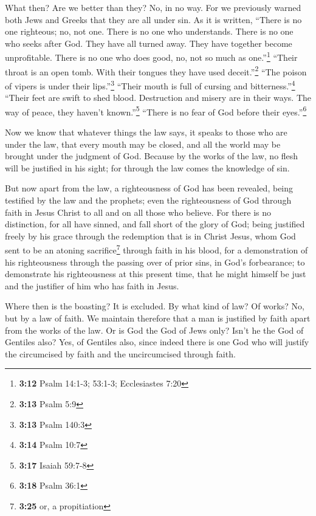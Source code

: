  What then? Are we better than they? No, in no way. For we
previously warned both Jews and Greeks that they are all under sin.
 As it is written, ``There is no one righteous; no, not
one.  There is no one who understands. There is no one
who seeks after God.  They have all turned away. They
have together become unprofitable. There is no one who does good, no,
not so much as one.''\footnote{\textbf{3:12} Psalm 14:1-3; 53:1-3;
  Ecclesiastes 7:20}  ``Their throat is an open tomb.
With their tongues they have used deceit.''\footnote{\textbf{3:13} Psalm
  5:9} ``The poison of vipers is under their lips.''\footnote{\textbf{3:13}
  Psalm 140:3}  ``Their mouth is full of cursing and
bitterness.''\footnote{\textbf{3:14} Psalm 10:7}  ``Their
feet are swift to shed blood.  Destruction and misery are
in their ways.  The way of peace, they haven't
known.''\footnote{\textbf{3:17} Isaiah 59:7-8}  ``There
is no fear of God before their eyes.''\footnote{\textbf{3:18} Psalm 36:1}

 Now we know that whatever things the law says, it speaks
to those who are under the law, that every mouth may be closed, and all
the world may be brought under the judgment of God. 
Because by the works of the law, no flesh will be justified in his
sight; for through the law comes the knowledge of sin.

 But now apart from the law, a righteousness of God has
been revealed, being testified by the law and the prophets;
 even the righteousness of God through faith in Jesus
Christ to all and on all those who believe. For there is no distinction,
 for all have sinned, and fall short of the glory of God;
 being justified freely by his grace through the
redemption that is in Christ Jesus,  whom God sent to be
an atoning sacrifice\footnote{\textbf{3:25} or, a propitiation} through
faith in his blood, for a demonstration of his righteousness through the
passing over of prior sins, in God's forbearance;  to
demonstrate his righteousness at this present time, that he might
himself be just and the justifier of him who has faith in Jesus.

 Where then is the boasting? It is excluded. By what kind
of law? Of works? No, but by a law of faith.  We maintain
therefore that a man is justified by faith apart from the works of the
law.  Or is God the God of Jews only? Isn't he the God of
Gentiles also? Yes, of Gentiles also,  since indeed there
is one God who will justify the circumcised by faith and the
uncircumcised through faith.

